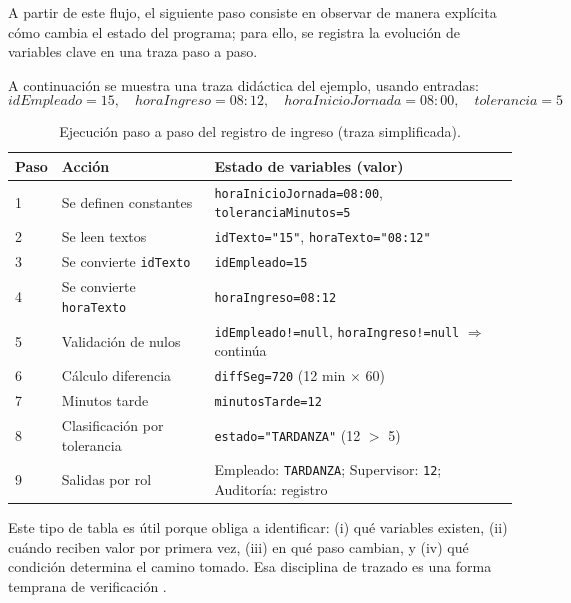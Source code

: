 \documentclass[12pt,twoside]{book}
\begin{document}
						\noindent
						A partir de este flujo, el siguiente paso consiste en observar de manera explícita cómo cambia el estado del programa; para ello, se registra la evolución de variables clave en una traza paso a paso.
						
						A continuación se muestra una traza didáctica del ejemplo, usando entradas:
						\[
						idEmpleado = 15,\quad horaIngreso = 08{:}12,\quad horaInicioJornada = 08{:}00,\quad tolerancia = 5
						\]
						
						\begin{table}[htbp]
							\centering
							\caption{Ejecución paso a paso del registro de ingreso (traza simplificada).}
							\label{tab:TrazaRegistroIngreso}
							\begin{tabular}{p{} p{} p{}}
								\hline
								\textbf{Paso} & \textbf{Acción} & \textbf{Estado de variables (valor)}\\
								\hline
								1 & Se definen constantes & \texttt{horaInicioJornada=08:00}, \texttt{toleranciaMinutos=5}\\
								2 & Se leen textos & \texttt{idTexto="15"}, \texttt{horaTexto="08:12"}\\
								3 & Se convierte \texttt{idTexto} & \texttt{idEmpleado=15}\\
								4 & Se convierte \texttt{horaTexto} & \texttt{horaIngreso=08:12}\\
								5 & Validación de nulos & \texttt{idEmpleado!=null}, \texttt{horaIngreso!=null} $\Rightarrow$ continúa\\
								6 & Cálculo diferencia & \texttt{diffSeg=720} (12 min $\times$ 60)\\
								7 & Minutos tarde & \texttt{minutosTarde=12}\\
								8 & Clasificación por tolerancia & \texttt{estado="TARDANZA"} (12 $>$ 5)\\
								9 & Salidas por rol & Empleado: \texttt{TARDANZA}; Supervisor: \texttt{12}; Auditoría: registro\\
								\hline
							\end{tabular}
						\end{table}
						
						\noindent
						Este tipo de tabla es útil porque obliga a identificar: (i) qué variables existen, (ii) cuándo reciben valor por primera vez, (iii) en qué paso cambian, y (iv) qué condición determina el camino tomado. Esa disciplina de trazado es una forma temprana de verificación \cite{Gaddis2022Starting,Hooshyar2015Flowchart,Cormen2022Introduction}.
						
\end{document}
